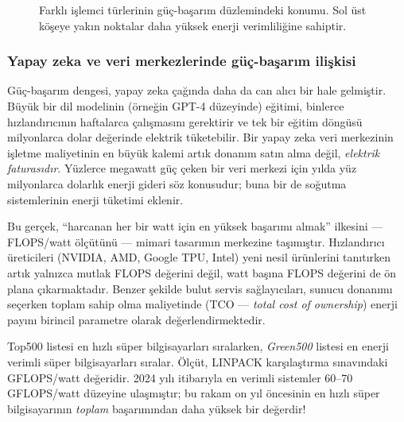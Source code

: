 \begin{figure}[H]
\caption[Farklı işlemci türlerinin güç-başarım düzlemindeki konumu]{Farklı işlemci türlerinin güç-başarım düzlemindeki konumu. Sol üst köşeye yakın noktalar daha yüksek enerji verimliliğine sahiptir.}
\label{fig:guc-basarim-dagilim}
\end{figure}

\subsubsection*{Yapay zeka ve veri merkezlerinde güç-başarım ilişkisi}
Güç-başarım dengesi, yapay zeka çağında daha da can alıcı bir hale gelmiştir. Büyük bir dil modelinin (örneğin GPT-4 düzeyinde) eğitimi, binlerce hızlandırıcının haftalarca çalışmasını gerektirir ve tek bir eğitim döngüsü milyonlarca dolar değerinde elektrik tüketebilir. Bir yapay zeka veri merkezinin işletme maliyetinin en büyük kalemi artık donanım satın alma değil, \emph{elektrik faturasıdır}. Yüzlerce megawatt güç çeken bir veri merkezi için yılda yüz milyonlarca dolarlık enerji gideri söz konusudur; buna bir de soğutma sistemlerinin enerji tüketimi eklenir.

Bu gerçek, ``harcanan her bir watt için en yüksek başarımı almak'' ilkesini --- FLOPS/watt ölçütünü --- mimari tasarımın merkezine taşımıştır. Hızlandırıcı üreticileri (NVIDIA, AMD, Google TPU, Intel) yeni nesil ürünlerini tanıtırken artık yalnızca mutlak FLOPS değerini değil, watt başına FLOPS değerini de ön plana çıkarmaktadır. Benzer şekilde bulut servis sağlayıcıları, sunucu donanımı seçerken toplam sahip olma maliyetinde (TCO --- \emph{total cost of ownership}) enerji payını birincil parametre olarak değerlendirmektedir.

\begin{bilginot}
Top500 listesi en hızlı süper bilgisayarları sıralarken, \emph{Green500} listesi en enerji verimli süper bilgisayarları sıralar. Ölçüt, LINPACK karşılaştırma sınavındaki GFLOPS/watt değeridir. 2024 yılı itibarıyla en verimli sistemler 60--70 GFLOPS/watt düzeyine ulaşmıştır; bu rakam on yıl öncesinin en hızlı süper bilgisayarının \emph{toplam} başarımından daha yüksek bir değerdir!
\end{bilginot}


